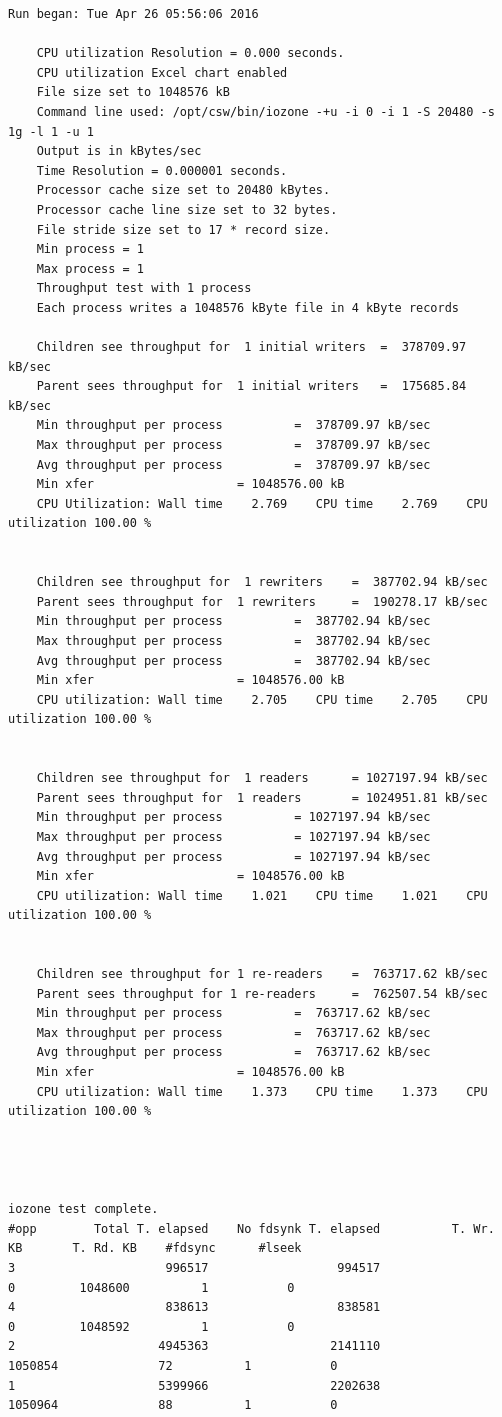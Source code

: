 \documentclass[a4paper]{article}
\begin{document}
{\begin{lstlisting}[style=output]
	Run began: Tue Apr 26 05:56:06 2016

	CPU utilization Resolution = 0.000 seconds.
	CPU utilization Excel chart enabled
	File size set to 1048576 kB
	Command line used: /opt/csw/bin/iozone -+u -i 0 -i 1 -S 20480 -s 1g -l 1 -u 1
	Output is in kBytes/sec
	Time Resolution = 0.000001 seconds.
	Processor cache size set to 20480 kBytes.
	Processor cache line size set to 32 bytes.
	File stride size set to 17 * record size.
	Min process = 1 
	Max process = 1 
	Throughput test with 1 process
	Each process writes a 1048576 kByte file in 4 kByte records

	Children see throughput for  1 initial writers 	=  378709.97 kB/sec
	Parent sees throughput for  1 initial writers 	=  175685.84 kB/sec
	Min throughput per process 			=  378709.97 kB/sec 
	Max throughput per process 			=  378709.97 kB/sec
	Avg throughput per process 			=  378709.97 kB/sec
	Min xfer 					= 1048576.00 kB
	CPU Utilization: Wall time    2.769    CPU time    2.769    CPU utilization 100.00 %


	Children see throughput for  1 rewriters 	=  387702.94 kB/sec
	Parent sees throughput for  1 rewriters 	=  190278.17 kB/sec
	Min throughput per process 			=  387702.94 kB/sec 
	Max throughput per process 			=  387702.94 kB/sec
	Avg throughput per process 			=  387702.94 kB/sec
	Min xfer 					= 1048576.00 kB
	CPU utilization: Wall time    2.705    CPU time    2.705    CPU utilization 100.00 %


	Children see throughput for  1 readers 		= 1027197.94 kB/sec
	Parent sees throughput for  1 readers 		= 1024951.81 kB/sec
	Min throughput per process 			= 1027197.94 kB/sec 
	Max throughput per process 			= 1027197.94 kB/sec
	Avg throughput per process 			= 1027197.94 kB/sec
	Min xfer 					= 1048576.00 kB
	CPU utilization: Wall time    1.021    CPU time    1.021    CPU utilization 100.00 %


	Children see throughput for 1 re-readers 	=  763717.62 kB/sec
	Parent sees throughput for 1 re-readers 	=  762507.54 kB/sec
	Min throughput per process 			=  763717.62 kB/sec 
	Max throughput per process 			=  763717.62 kB/sec
	Avg throughput per process 			=  763717.62 kB/sec
	Min xfer 					= 1048576.00 kB
	CPU utilization: Wall time    1.373    CPU time    1.373    CPU utilization 100.00 %




iozone test complete.
#opp 	    Total T. elapsed	No fdsynk T. elapsed	      T. Wr. KB	      T. Rd. KB	   #fdsync	    #lseek
3    	              996517	              994517	              0	        1048600	         1	         0
4    	              838613	              838581	              0	        1048592	         1	         0
2    	             4945363	             2141110	        1050854	             72	         1	         0
1    	             5399966	             2202638	        1050964	             88	         1	         0



\end{lstlisting}}
\end{document}

